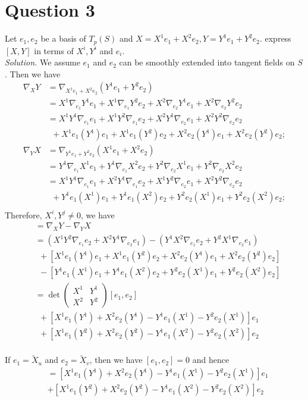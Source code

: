 \documentclass[12pt]{article}
\begin{document}
\section*{Question 3}
Let $e_1,e_2$ be a basis of $T_p(S)$ and $X=X^1e_1+X^2e_2, Y=Y^1e_1+Y^2e_2$. express $[X,Y]$ in terms of $X^i, Y^i$ and $e_i$.
\\
\textit{Solution.} We assume $e_1$ and $e_2$ can be smoothly extended into tangent fields on $S$. Then we have
\begin{align*}
    \nabla_XY &= \nabla_{X^1e_1+X^2e_2}(Y^1e_1+Y^2e_2)\\
    &=X^1\nabla_{e_1}Y^1e_1 + X^1\nabla_{e_1}Y^2e_2 +
    X^2\nabla_{e_2}Y^1e_1 + X^2\nabla_{e_2}Y^2e_2\\
    &=X^1Y^1\nabla_{e_1}e_1 + X^1Y^2\nabla_{e_1}e_2 +
    X^2Y^1\nabla_{e_2}e_1 + X^2Y^2\nabla_{e_2}e_2\\
    &~~+X^1e_1(Y^1)e_1 + X^1e_1(Y^2)e_2+ X^2e_2(Y^1)e_1+X^2e_2(Y^2)e_2;\\
    \nabla_YX &= \nabla_{Y^1e_1+Y^2e_2}(X^1e_1+X^2e_2)\\
    &=Y^1\nabla_{e_1}X^1e_1 + Y^1\nabla_{e_1}X^2e_2 +
    Y^2\nabla_{e_2}X^1e_1 + Y^2\nabla_{e_2}X^2e_2\\
    &=X^1Y^1\nabla_{e_1}e_1 + X^2Y^1\nabla_{e_1}e_2 +
    X^1Y^2\nabla_{e_2}e_1 + X^2Y^2\nabla_{e_2}e_2\\
    &~~+Y^1e_1(X^1)e_1 + Y^1e_1(X^2)e_2+ Y^2e_2(X^1)e_1+Y^2e_2(X^2)e_2;\\
\end{align*}
Therefore, $X^i,Y^j\neq 0$, we have \begin{align*}
    [X,Y] &= \nabla_XY - \nabla_YX\\
    &=(X^1Y^2\nabla_{e_1}e_2 +
    X^2Y^1\nabla_{e_2}e_1)-(Y^1X^2\nabla_{e_1}e_2 +
    Y^2X^1\nabla_{e_2}e_1)\\
    &~~+[X^1e_1(Y^1)e_1 + X^1e_1(Y^2)e_2+ X^2e_2(Y^1)e_1+X^2e_2(Y^2)e_2]\\
    &~~-[Y^1e_1(X^1)e_1 + Y^1e_1(X^2)e_2+ Y^2e_2(X^1)e_1+Y^2e_2(X^2)e_2]\\
    &=\det\begin{pmatrix}
         X^1&Y^1\\
         X^2&Y^2
    \end{pmatrix}[e_1,e_2]\\
    &~~+[X^1e_1(Y^1)+X^2e_2(Y^1)-Y^1e_1(X^1)-Y^2e_2(X^1)]e_1\\
    &~~+[X^1e_1(Y^2)+X^2e_2(Y^2)-Y^1e_1(X^2)-Y^2e_2(X^2)]e_2\\
\end{align*}

If $e_1 = \utilde{X}_u$ and $e_2 = \utilde{X}_v$, then we have $[e_1,e_2] = 0$ and hence
\begin{align*}
    [X,Y] &= [X^1e_1(Y^1)+X^2e_2(Y^1)-Y^1e_1(X^1)-Y^2e_2(X^1)]e_1\\
    &+[X^1e_1(Y^2)+X^2e_2(Y^2)-Y^1e_1(X^2)-Y^2e_2(X^2)]e_2\\
\end{align*}
\end{document}
